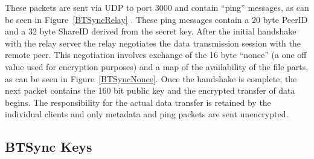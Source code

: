 \documentclass[final,5p,times,twocolumn]{elsarticle}
\begin{document}
\begin{enumerate}
These packets are sent via UDP to port 3000 and contain ``ping'' messages, as can be seen in Figure~\ref{BTSyncRelay} . These ping messages contain a 20 byte PeerID and a 32 byte ShareID derived from the secret key. After the initial handshake with the relay server the relay negotiates the data transmission session with the remote peer. This negotiation involves exchange of the 16 byte ``nonce'' (a one off value used for encryption purposes) and a map of the availability of the file parts, as can be seen in Figure~\ref{BTSyncNonce}. Once the handshake is complete, the next packet contains the 160 bit public key and the encrypted transfer of data begins. The responsibility for the actual data transfer is retained by the individual clients and only metadata and ping packets are sent unencrypted. 
\end{enumerate}


\subsection{BTSync Keys}
\label{BTKey}
\end{document}

